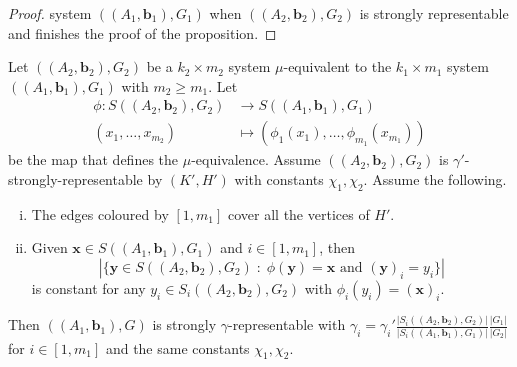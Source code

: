\begin {proof}
system $((A_1,\mathbf {b}_1),G_1)$ when $((A_2,\mathbf {b}_2),G_2)$ is strongly representable and finishes the proof of the proposition.
 \end {proof} 
 
 \begin {proposition} 
  \label {p.mu-equivalent_2} Let $((A_2,\mathbf {b}_2),G_2)$ be a $k_2\times m_2$ system $\mu $-equivalent to the $k_1\times m_1$ system $((A_1,\mathbf {b}_1),G_1)$ with $m_2\geq m_1$. Let \begin {align} \phi :S((A_2,\mathbf {b}_2),G_2)&\longrightarrow S((A_1,\mathbf {b}_1),G_1) \nonumber \\ (x_1,\ldots ,x_{m_2}) &\longmapsto \left (\phi _1(x_{1}),\ldots ,\phi _{m_1}(x_{m_1})\right ) \nonumber \end {align} be the map that defines the $\mu $-equivalence. Assume $((A_2,\mathbf {b}_2),G_2)$ is $\gamma '$-strongly-representable by $(K',H')$ with constants $\chi _1,\chi _2$. Assume the following. \begin {enumerate}[(i)] \item \label {h.1} The edges coloured by $[1,m_1]$ cover all the vertices of $H'$. \item \label {h.2} Given $\mathbf {x}\in S((A_1,\mathbf {b}_1),G_1)$ and $i\in [1,m_1]$, then \begin {displaymath} \left \vert \{\mathbf {y}\in S((A_2,\mathbf {b}_2),G_2)\; : \; \phi (\mathbf {y})=\mathbf {x} \text { and } (\mathbf {y})_i = y_i \}\right | \end {displaymath} is constant for any $y_i\in S_i((A_2,\mathbf {b}_2),G_2)$ with $\phi _i(y_i)=(\mathbf {x})_i$. \end {enumerate} Then $((A_1,\mathbf {b}_1),G)$ is strongly $\gamma $-representable with $\gamma _i=\gamma _i'\frac {|S_i((A_2,\mathbf {b}_2),G_2)|}{|S_i((A_1,\mathbf {b}_1),G_1)|}\frac {|G_1|}{|G_2|}$ for $i\in [1,m_1]$ and the same constants $\chi _1,\chi _2$.
 \end {proposition} 
 
